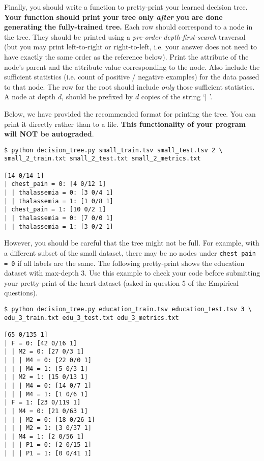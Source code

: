 \documentclass[11pt,addpoints,answers]{exam}
\begin{document}
Finally, you should write a function to pretty-print your learned decision tree. \textbf{Your function should print your tree only \emph{after} you are done generating the fully-trained tree.} Each row should correspond to a node in the tree. They should be printed using a \emph{pre-order depth-first-search} traversal (but you may print left-to-right or right-to-left, i.e. your answer does not need to have exactly the same order as the reference below). Print the attribute of the node's parent and the attribute value corresponding to the node. Also include the sufficient statistics (i.e. count of positive / negative examples) for the data passed to that node. The row for the root should include \emph{only} those sufficient statistics. A node at depth $d$, should be prefixed by $d$ copies of the string `$\mid$ '.

Below, we have provided the recommended format for printing the tree. You can print it directly rather than to a file. \textbf{This functionality of your program will NOT be autograded}.

\begin{lstlisting}[language=Shell]
$ python decision_tree.py small_train.tsv small_test.tsv 2 \ 
small_2_train.txt small_2_test.txt small_2_metrics.txt

[14 0/14 1]
| chest_pain = 0: [4 0/12 1]
| | thalassemia = 0: [3 0/4 1]
| | thalassemia = 1: [1 0/8 1]
| chest_pain = 1: [10 0/2 1]
| | thalassemia = 0: [7 0/0 1]
| | thalassemia = 1: [3 0/2 1]
\end{lstlisting}

However, you should be careful that the tree might not be full. For example, with a different subset of the small dataset, there may be no nodes under \lstinline{chest_pain = 0} if all labels are the same.
\clearpage
The following pretty-print shows the education dataset with max-depth 3.  Use this example to check your code before submitting your pretty-print of the heart dataset (asked in question 5 of the Empirical questions).  

\begin{lstlisting}[language=Shell]
$ python decision_tree.py education_train.tsv education_test.tsv 3 \
edu_3_train.txt edu_3_test.txt edu_3_metrics.txt

[65 0/135 1]
| F = 0: [42 0/16 1]
| | M2 = 0: [27 0/3 1]
| | | M4 = 0: [22 0/0 1]
| | | M4 = 1: [5 0/3 1]
| | M2 = 1: [15 0/13 1]
| | | M4 = 0: [14 0/7 1]
| | | M4 = 1: [1 0/6 1]
| F = 1: [23 0/119 1]
| | M4 = 0: [21 0/63 1]
| | | M2 = 0: [18 0/26 1]
| | | M2 = 1: [3 0/37 1]
| | M4 = 1: [2 0/56 1]
| | | P1 = 0: [2 0/15 1]
| | | P1 = 1: [0 0/41 1]
\end{lstlisting}
\end{document}
